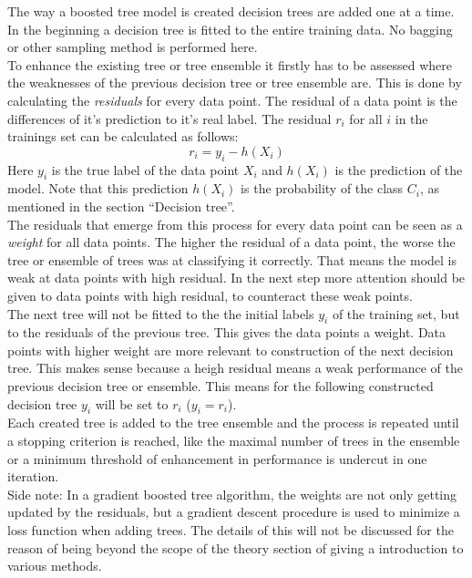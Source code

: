 The way a boosted tree model is created decision trees are added one at a time.
\\
In the beginning a decision tree is fitted to the entire training data. No bagging or other sampling method is performed here. 
\\
To enhance the existing tree or tree ensemble it firstly has to be assessed where the weaknesses of the previous decision tree or tree ensemble are. This is done by calculating the \emph{residuals} for every data point. The residual of a data point is the differences of it's prediction to it's real label. The residual $r_i$ for all $i$ in the trainings set can be calculated as follows:
 \begin{equation} \label{eq:20}
r_i=y_i-h(X_i)
\end{equation}
Here $y_i$ is the true label of the data point $X_i$ and $h(X_i)$ is the prediction of the model. Note that this prediction $h(X_i)$ is the probability of the class $C_i$, as mentioned in the section ``Decision tree''.
\\
The residuals that emerge from this process for every data point can be seen as a \emph{weight} for all data points. The higher the residual of a data point, the worse the tree or ensemble of trees was at classifying it correctly. That means the model is weak at data points with high residual. In the next step more attention should be given to data points with high residual, to counteract these weak points.
\\
The next tree will not be fitted to the the initial labels $y_i$ of the training set, but to the residuals of the previous tree. This gives the data points a weight. Data points with higher weight are more relevant to construction of the  next decision tree. This makes sense because a heigh residual means a weak performance of the previous decision tree or ensemble. This means for the following constructed decision tree $y_i$ will be set to $r_i$ ($y_i=r_i$).
\\
Each created tree is added to the tree ensemble and the process is repeated until a stopping criterion is reached, like the maximal number of trees in the ensemble or a minimum threshold of enhancement in performance is undercut in one iteration.
\\
Side note: In a gradient boosted tree algorithm, the weights are not only getting updated by the residuals, but a gradient descent procedure is used to minimize a loss function when adding trees. The details of this will not be discussed for the reason of being beyond the scope of the theory section of giving a introduction to various methods.
\\

